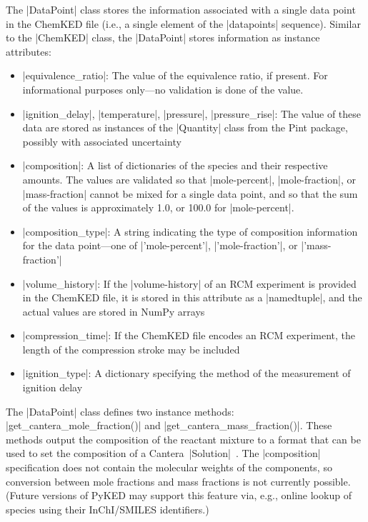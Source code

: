\documentclass[12pt]{ijck}
\newcommand\ck{ChemKED}
\newcommand\pk{PyKED}
\begin{document}
The \pybox|DataPoint| class stores the information associated with a single data
point in the \ck{} file (i.e., a single element of the \yabox|datapoints|
sequence). Similar to the \pybox|ChemKED| class,
the \pybox|DataPoint| stores information as instance attributes:
%
\begin{itemize}
    \item \pybox|equivalence_ratio|: The value of the equivalence ratio, if
    present. For informational purposes only---no validation is done of the
    value.
    \item \pybox|ignition_delay|, \pybox|temperature|, \pybox|pressure|,
    \pybox|pressure_rise|: The value of these data are stored as instances of
    the \pybox|Quantity| class from the Pint \autocite{Grecco2016} package,
    possibly with associated uncertainty
    \item \pybox|composition|: A list of dictionaries of the species and their
    respective amounts. The values are validated so that \yabox|mole-percent|,
    \yabox|mole-fraction|, or \yabox|mass-fraction| cannot be mixed for a single
    data point, and so that the sum of the values is approximately 1.0, or
    100.0 for \yabox|mole-percent|.
    \item \pybox|composition_type|: A string indicating the type of composition
    information for the data point---one of \pybox|'mole-percent'|,
    \pybox|'mole-fraction'|, or \pybox|'mass-fraction'|
    \item \pybox|volume_history|: If the \yabox|volume-history| of an RCM
    experiment is provided in the \ck{} file, it is stored in this attribute as
    a \pybox|namedtuple|, and the actual values are stored in NumPy arrays
    \autocite{vanderWalt:2011np}
    \item \pybox|compression_time|: If the \ck{} file encodes an RCM experiment,
    the length of the compression stroke may be included
    \item \pybox|ignition_type|: A dictionary specifying the method of the
    measurement of ignition delay
\end{itemize}

The \pybox|DataPoint| class defines two instance methods:
\pybox|get_cantera_mole_fraction()| and \pybox|get_cantera_mass_fraction()|.
These methods output the composition of the reactant mixture to a
format that can be used to set the composition of a
Cantera~\pybox|Solution|~\autocite{Cantera:2.3.0}.
The \pybox|composition| specification does not contain the molecular
weights of the components, so conversion between mole fractions and mass
fractions is not currently possible. (Future versions of \pk{} may support this
feature via, e.g., online lookup of species using their InChI\slash SMILES
identifiers.)
\end{document}
